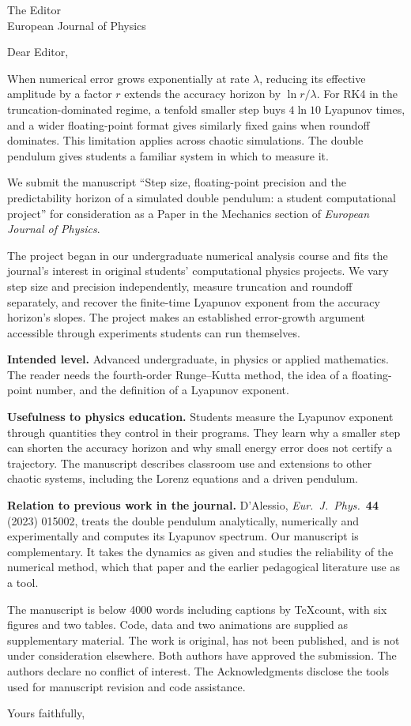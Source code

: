 \documentclass[10pt]{letter}
\begin{document}
\begin{letter}{The Editor\\ European Journal of Physics}
\opening{Dear Editor,}

When numerical error grows exponentially at rate $\lambda$, reducing its
effective amplitude by a factor $r$ extends the accuracy horizon by
$\ln r/\lambda$. For RK4 in the truncation-dominated regime, a tenfold smaller
step buys $4\ln10$ Lyapunov times, and a wider floating-point format gives
similarly fixed gains when roundoff dominates. This limitation applies across
chaotic simulations. The double pendulum gives students a familiar system in
which to measure it.

We submit the manuscript ``Step size, floating-point precision and the
predictability horizon of a simulated double pendulum: a student computational
project'' for consideration as a Paper in the Mechanics section of
\emph{European Journal of Physics}.

The project began in our undergraduate numerical analysis course and fits the
journal's interest in original students' computational physics projects. We
vary step size and precision independently, measure truncation and roundoff
separately, and recover the finite-time Lyapunov exponent from the accuracy
horizon's slopes. The project makes an established error-growth argument
accessible through experiments students can run themselves.

\textbf{Intended level.} Advanced undergraduate, in physics or applied
mathematics. The reader needs the fourth-order Runge--Kutta method, the idea of a
floating-point number, and the definition of a Lyapunov exponent.

\textbf{Usefulness to physics education.} Students measure the Lyapunov
exponent through quantities they control in their programs. They learn why a
smaller step can shorten the accuracy horizon and why small energy error does
not certify a trajectory. The manuscript describes classroom use and extensions
to other chaotic systems, including the Lorenz equations and a driven pendulum.

\textbf{Relation to previous work in the journal.} D'Alessio, \emph{Eur.\ J.\
Phys.}\ \textbf{44} (2023) 015002, treats the double pendulum analytically,
numerically and experimentally and computes its Lyapunov spectrum. Our manuscript
is complementary. It takes the dynamics as given and studies the reliability of
the numerical method, which that paper and the earlier pedagogical literature
use as a tool.

The manuscript is below 4000 words including captions by TeXcount, with six figures and two tables. Code, data
and two animations are supplied as supplementary material. The work is original,
has not been published, and is not under consideration elsewhere. Both authors have approved the submission. The authors declare no conflict of interest. The Acknowledgments disclose
the tools used for manuscript revision and code assistance.

\closing{Yours faithfully,}
\end{letter}
\end{document}
